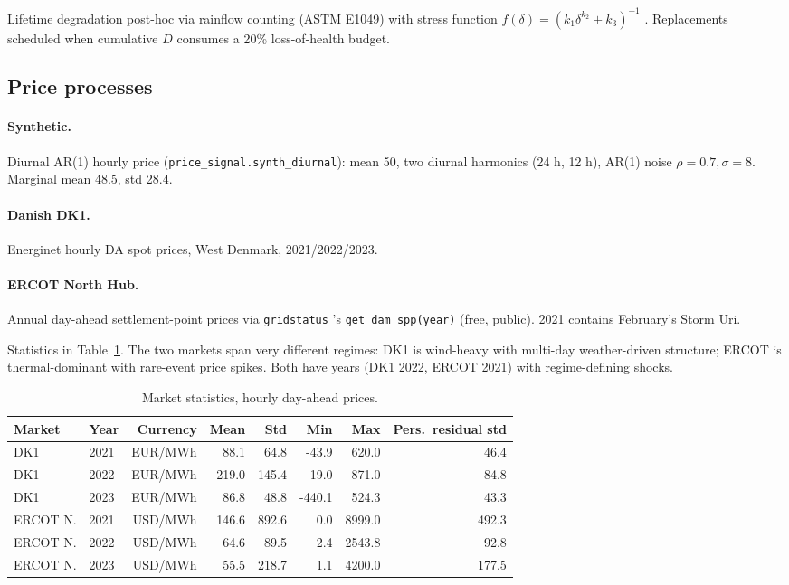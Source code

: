 \documentclass[11pt]{article}
\begin{document}
Lifetime degradation post-hoc via rainflow counting (ASTM E1049) with stress function $f(\delta) = (k_1 \delta^{k_2} + k_3)^{-1}$ \citep{xu2018modeling}. Replacements scheduled when cumulative $D$ consumes a 20\% loss-of-health budget.

\subsection{Price processes}

\paragraph{Synthetic.} Diurnal AR(1) hourly price (\texttt{price\_signal.synth\_diurnal}): mean 50, two diurnal harmonics (24 h, 12 h), AR(1) noise $\rho = 0.7, \sigma = 8$. Marginal mean 48.5, std 28.4.

\paragraph{Danish DK1.} Energinet \citep{energinet2024} hourly DA spot prices, West Denmark, 2021/2022/2023.

\paragraph{ERCOT North Hub.} Annual day-ahead settlement-point prices via \texttt{gridstatus} \citep{gridstatus2024}'s \texttt{get\_dam\_spp(year)} (free, public). 2021 contains February's Storm Uri.

Statistics in Table~\ref{tab:marketstats}. The two markets span very different regimes: DK1 is wind-heavy with multi-day weather-driven structure; ERCOT is thermal-dominant with rare-event price spikes. Both have years (DK1 2022, ERCOT 2021) with regime-defining shocks.

\begin{table}[t]
\centering\small
\caption{\label{tab:marketstats}Market statistics, hourly day-ahead prices.}
\begin{tabular}{llrrrrrr}
\toprule
Market & Year & Currency & Mean & Std & Min & Max & Pers.\ residual std \\
\midrule
DK1 & 2021 & EUR/MWh & 88.1   & 64.8   & -43.9   & 620.0  & 46.4  \\
DK1 & 2022 & EUR/MWh & 219.0  & 145.4  & -19.0   & 871.0  & 84.8  \\
DK1 & 2023 & EUR/MWh & 86.8   & 48.8   & -440.1  & 524.3  & 43.3  \\
ERCOT N. & 2021 & USD/MWh & 146.6  & 892.6  & 0.0     & 8999.0 & 492.3 \\
ERCOT N. & 2022 & USD/MWh & 64.6   & 89.5   & 2.4     & 2543.8 & 92.8  \\
ERCOT N. & 2023 & USD/MWh & 55.5   & 218.7  & 1.1     & 4200.0 & 177.5 \\
\bottomrule
\end{tabular}
\end{table}
\end{document}
